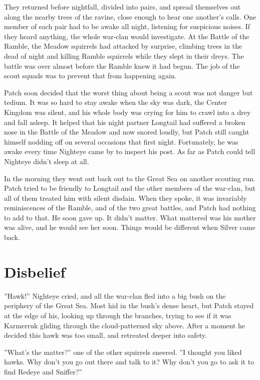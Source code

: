 \documentclass[12pt]{book}
\begin{document}
They returned before nightfall, divided into pairs, and spread
themselves out along the nearby trees of the ravine, close enough to
hear one another's calls. One member of each pair had to be awake all
night, listening for suspicious noises. If they heard anything, the
whole war-clan would investigate. At the Battle of the Ramble, the
Meadow squirrels had attacked by surprise, climbing trees in the dead
of night and killing Ramble squirrels while they slept in their
dreys. The battle was over almost before the Ramble knew it had
begun. The job of the scout squads was to prevent that from happening
again.

Patch soon decided that the worst thing about being a scout was not
danger but tedium. It was so hard to stay awake when the sky was dark,
the Center Kingdom was silent, and his whole body was crying for him
to crawl into a drey and fall asleep. It helped that his night partner
Longtail had suffered a broken nose in the Battle of the Meadow and
now snored loudly, but Patch still caught himself nodding off on
several occasions that first night. Fortunately, he was awake every
time Nighteye came by to inspect his post. As far as Patch could tell
Nighteye didn't sleep at all.

In the morning they went out back out to the Great Sea on another
scouting run. Patch tried to be friendly to Longtail and the other
members of the war-clan, but all of them treated him with silent
disdain. When they spoke, it was invariably reminiscences of the
Ramble, and of the two great battles, and Patch had nothing to add to
that. He soon gave up. It didn't matter. What mattered was his mother
was alive, and he would see her soon. Things would be different when
Silver came back.


\section{Disbelief}

''Hawk!'' Nighteye cried, and all the war-clan fled into a big bush on
the periphery of the Great Sea. Most hid in the bush's dense heart,
but Patch stayed at the edge of his, looking up through the branches,
trying to see if it was Karmerruk gliding through the cloud-patterned
sky above. After a moment he decided this hawk was too small, and
retreated deeper into safety.

''What's the matter?'' one of the other squirrels sneered. ''I thought
you liked hawks. Why don't you go out there and talk to it? Why don't
you go to ask it to find Redeye and Sniffer?''
\end{document}

